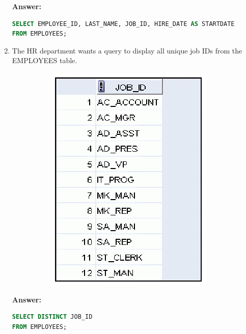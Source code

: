 \documentclass[a4paper,12pt]{article}
\begin{document}
\begin{enumerate}[start=4]
    \textbf{Answer: }
    \begin{lstlisting}[language=SQL]
SELECT EMPLOYEE_ID, LAST_NAME, JOB_ID, HIRE_DATE AS STARTDATE
FROM EMPLOYEES;
    \end{lstlisting}
    
    \newpage
    \item The HR department wants a query to display all unique job IDs from the EMPLOYEES table.
    \begin{figure}[h]
        \centering
        \begin{subfigure}[b]{0.3\linewidth}
            \centering
            \includegraphics[width=\linewidth]{graphics/7.png}
        \end{subfigure}
    \end{figure}
   
    \textbf{Answer: }
    \begin{lstlisting}[language=SQL]
SELECT DISTINCT JOB_ID
FROM EMPLOYEES;
    \end{lstlisting}
    
\end{enumerate}
\end{document}
